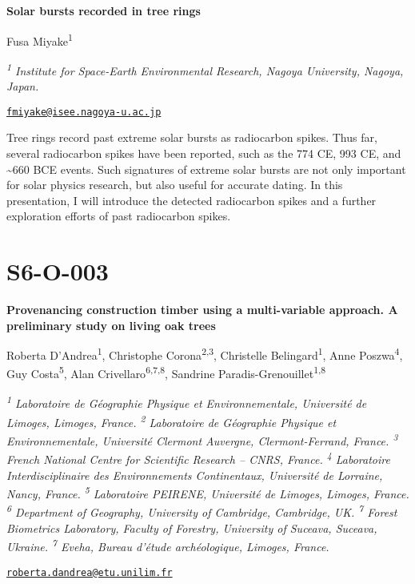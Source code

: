 \documentclass[
]{book}
\begin{document}
\textbf{Solar bursts recorded in tree rings}

Fusa Miyake\textsuperscript{1}

\emph{\textsuperscript{1} Institute for Space-Earth Environmental Research, Nagoya University, Nagoya, Japan.}

\href{mailto:fmiyake@isee.nagoya-u.ac.jp}{\nolinkurl{fmiyake@isee.nagoya-u.ac.jp}}

Tree rings record past extreme solar bursts as radiocarbon spikes. Thus far, several radiocarbon spikes have been reported, such as the 774 CE, 993 CE, and \textasciitilde660 BCE events. Such signatures of extreme solar bursts are not only important for solar physics research, but also useful for accurate dating. In this presentation, I will introduce the detected radiocarbon spikes and a further exploration efforts of past radiocarbon spikes.

\hypertarget{s6-o-003}{%
\section*{S6-O-003}\label{s6-o-003}}

\textbf{Provenancing construction timber using a multi-variable approach. A preliminary study on living oak trees}

Roberta D'Andrea\textsuperscript{1}, Christophe Corona\textsuperscript{2,3}, Christelle Belingard\textsuperscript{1}, Anne Poszwa\textsuperscript{4}, Guy Costa\textsuperscript{5}, Alan Crivellaro\textsuperscript{6,7,8}, Sandrine Paradis-Grenouillet\textsuperscript{1,8}

\emph{\textsuperscript{1} Laboratoire de Géographie Physique et Environnementale, Université de Limoges, Limoges, France. \textsuperscript{2} Laboratoire de Géographie Physique et Environnementale, Université Clermont Auvergne, Clermont-Ferrand, France. \textsuperscript{3} French National Centre for Scientific Research -- CNRS, France. \textsuperscript{4} Laboratoire Interdisciplinaire des Environnements Continentaux, Université de Lorraine, Nancy, France. \textsuperscript{5} Laboratoire PEIRENE, Université de Limoges, Limoges, France. \textsuperscript{6} Department of Geography, University of Cambridge, Cambridge, UK. \textsuperscript{7} Forest Biometrics Laboratory, Faculty of Forestry, University of Suceava, Suceava, Ukraine. \textsuperscript{7} Eveha, Bureau d'étude archéologique, Limoges, France.}

\href{mailto:roberta.dandrea@etu.unilim.fr}{\nolinkurl{roberta.dandrea@etu.unilim.fr}}
\end{document}

